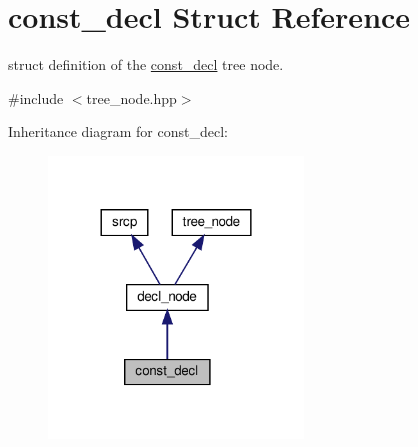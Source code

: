 \hypertarget{structconst__decl}{}\section{const\+\_\+decl Struct Reference}
\label{structconst__decl}


struct definition of the \hyperlink{structconst__decl}{const\+\_\+decl} tree node.  




{\ttfamily \#include $<$tree\+\_\+node.\+hpp$>$}



Inheritance diagram for const\+\_\+decl\+:
\nopagebreak
\begin{figure}[H]
\begin{center}
\leavevmode
\includegraphics[width=192pt]{d7/da8/structconst__decl__inherit__graph}
\end{center}
\end{figure}


